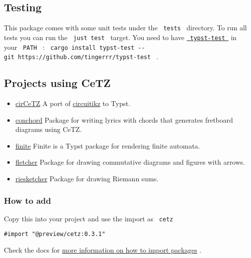 \subsection{Testing}\label{testing}

This package comes with some unit tests under the \texttt{\ tests\ }
directory. To run all tests you can run the \texttt{\ just\ test\ }
target. You need to have
\href{https://github.com/tingerrr/typst-test/}{\texttt{\ typst-test\ }}
in your \texttt{\ PATH\ } :
\texttt{\ cargo\ install\ typst-test\ -\/-git\ https://github.com/tingerrr/typst-test\ }
.

\subsection{Projects using CeTZ}\label{projects-using-cetz}

\begin{itemize}
\tightlist
\item
  \href{https://github.com/fenjalien/cirCeTZ}{cirCeTZ} A port of
  \href{https://github.com/circuitikz/circuitikz}{circuitikz} to Typst.
\item
  \href{https://github.com/sitandr/conchord}{conchord} Package for
  writing lyrics with chords that generates fretboard diagrams using
  CeTZ.
\item
  \href{https://github.com/jneug/typst-finite}{finite} Finite is a Typst
  package for rendering finite automata.
\item
  \href{https://github.com/Jollywatt/typst-fletcher}{fletcher} Package
  for drawing commutative diagrams and figures with arrows.
\item
  \href{https://github.com/ThatOneCalculator/riesketcher}{riesketcher}
  Package for drawing Riemann sums.
\end{itemize}

\subsubsection{How to add}\label{how-to-add}

Copy this into your project and use the import as \texttt{\ cetz\ }

\begin{verbatim}
#import "@preview/cetz:0.3.1"
\end{verbatim}



Check the docs for
\href{https://typst.app/docs/reference/scripting/\#packages}{more
information on how to import packages} .

